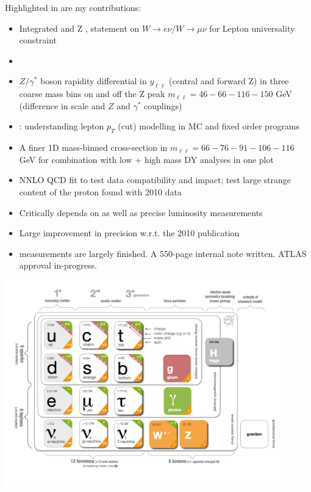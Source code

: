 {
  Highlighted in  are my contributions:
  \vspace{-.1cm}
  \begin{itemize}
  \item Integrated  and Z , statement on $W\to
    e\nu/W\to\mu\nu$ for Lepton universality constraint
  \item {}
  \item $Z/\gamma^*$ boson rapidity differential in $y_{\ell\ell}$ (central and forward Z) in
    three coarse mass bins on and off the Z peak $m_{\ell\ell} = 46 -
    66 - 116 - 150$ GeV (difference in scale and $Z$ and $\gamma^*$ couplings)
  \item {}: understanding lepton $p_T$ (cut)
    modelling in MC and fixed order programs
  \item A finer 1D mass-binned cross-section in $m_{\ell\ell} =
    66-76-91-106-116$ GeV for combination with low + high mass DY
    analyses in one plot
  \item NNLO QCD fit to test data compatibility and impact; test large
    strange content of the proton found with 2010 data
  \end{itemize}
  \vspace{.3cm}
  \begin{itemize}
  \item Critically depends on  as well as precise luminosity measurements
  \item Large improvement in precision w.r.t. the 2010 publication
  \item {} measurements are largely finished. A 550-page internal note written. ATLAS approval in-progress.
  \end{itemize}

}

{
\includegraphics[width=0.9\textwidth]{dates/mtg/figures/wz/sm}
}

